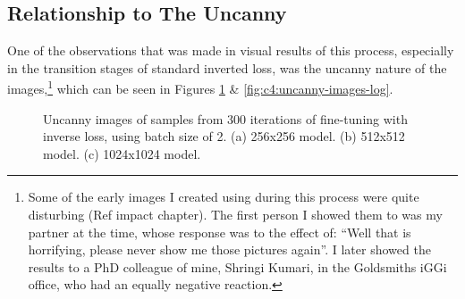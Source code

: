 \subsection{Relationship to The Uncanny}

One of the observations that was made in visual results of this process, especially in the transition stages of standard inverted loss, was the uncanny nature of the images,\footnote{
      Some of the early images I created using during this process were quite disturbing  (Ref impact chapter). The first person I showed them to was my partner at the time, whose response was to the effect of: ``Well that is horrifying, please never show me those pictures again''. I later showed the results to a PhD colleague of mine, Shringi Kumari, in the Goldsmiths iGGi office, who had an equally negative reaction.} which can be seen in Figures \ref{fig:c4:uncanny-images-og} \& \ref{fig:c4:uncanny-images-log}.

\begin{figure}[!htbp]
  \vspace{-60pt}
  \centering
  \hfill
  \hfill
  \caption[Uncanny images of samples from 300 iterations of fine-tuning with inverse loss]{Uncanny images of samples from 300 iterations of fine-tuning with inverse loss, using batch size of 2. (a) 256x256 model. (b) 512x512 model. (c) 1024x1024 model. }
  \label{fig:c4:uncanny-images-og}
\end{figure}

